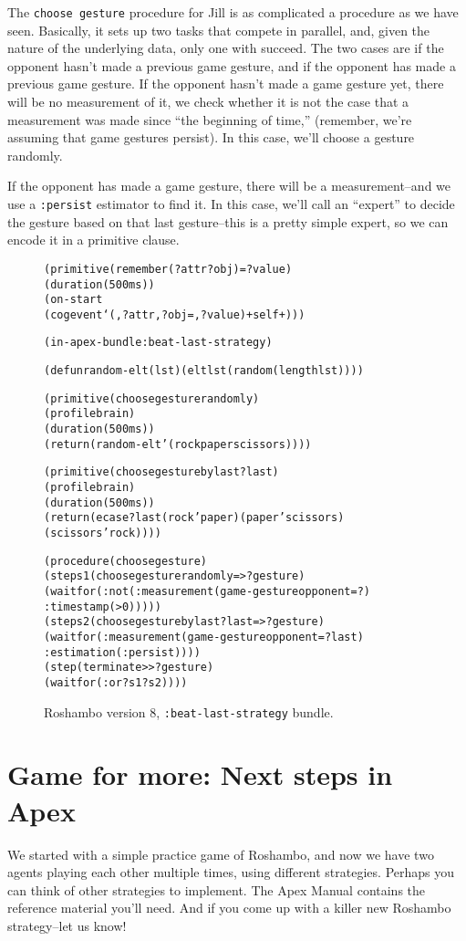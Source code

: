 \documentclass[12pt]{article}
\newcommand{\ic}{\texttt}
\newenvironment{code}%
   {\begin{alltt}}%
   {\end{alltt}}
\newenvironment{float}%
   {\begin{center}}%
   {\end{center}
   }
\begin{document}
The \ic{choose gesture} procedure for Jill is as complicated a procedure as we have seen. Basically, it sets up two tasks that compete in parallel, and, given the nature of the underlying data, only one with succeed. The two cases are if the opponent hasn't made a previous game gesture, and if the opponent has made a previous game gesture. If the opponent hasn't made a game gesture yet, there will be no measurement of it, we check whether it is not the case that a measurement was made since ``the beginning of time,'' (remember, we're assuming that game gestures persist). In this case, we'll choose a gesture randomly.

If the opponent has made a game gesture, there will be a measurement--and we use a \ic{:persist} estimator to find it. In this case, we'll call an ``expert'' to decide the gesture based on that last gesture--this is a pretty simple expert, so we can encode it in a primitive clause.

\begin{figure}
\begin{float}
\begin{code}
(primitive (remember (?attr ?obj) = ?value)  
  (duration (500 ms))
  (on-start
   (cogevent `(,?attr ,?obj = ,?value) +self+)))

(in-apex-bundle :beat-last-strategy)

(defun random-elt (lst) (elt lst (random (length lst))))

(primitive (choose gesture randomly)
  (profile brain)
  (duration (500 ms))
  (return (random-elt '(rock paper scissors))))

(primitive (choose gesture by last ?last)
  (profile brain)
  (duration (500 ms))
  (return (ecase ?last (rock 'paper) (paper 'scissors) (scissors 'rock))))

(procedure (choose gesture)
  (step s1 (choose gesture randomly => ?gesture)
    (waitfor (:not (:measurement (game-gesture opponent = ?)
                    :timestamp (> 0)))))
  (step s2 (choose gesture by last ?last => ?gesture)
    (waitfor (:measurement (game-gesture opponent = ?last)
                :estimation (:persist))))
  (step (terminate >> ?gesture)
    (waitfor (:or ?s1 ?s2))))
\end{code}
\end{float}
\caption{Roshambo version 8, \ic{:beat-last-strategy} bundle.\label{fig.roshambo.8}}
\end{figure}



\htmlpagebreak
\section{Game for more: Next steps in Apex}

We started with a simple practice game of Roshambo, and now we have two agents playing each other multiple times, using different strategies. Perhaps you can think of other strategies to implement. The Apex Manual contains the reference material you'll need. And if you come up with a killer new Roshambo strategy--let us know!


 
\end{document}
